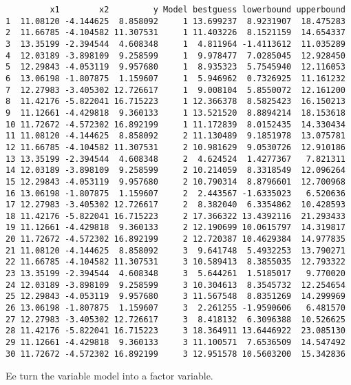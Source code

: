 \documentclass[]{article}
\newenvironment{Shaded}{\begin{snugshade}}{\end{snugshade}}
\newcommand{\DataTypeTok}[1]{\textcolor[rgb]{0.13,0.29,0.53}{#1}}
\newcommand{\DecValTok}[1]{\textcolor[rgb]{0.00,0.00,0.81}{#1}}
\newcommand{\KeywordTok}[1]{\textcolor[rgb]{0.13,0.29,0.53}{\textbf{#1}}}
\newcommand{\NormalTok}[1]{#1}
\newcommand{\OperatorTok}[1]{\textcolor[rgb]{0.81,0.36,0.00}{\textbf{#1}}}
\newcommand{\StringTok}[1]{\textcolor[rgb]{0.31,0.60,0.02}{#1}}
\begin{document}
\begin{verbatim}
         x1        x2         y Model bestguess lowerbound upperbound
1  11.08120 -4.144625  8.858092     1 13.699237  8.9231907  18.475283
2  11.66785 -4.104582 11.307531     1 11.403226  8.1521159  14.654337
3  13.35199 -2.394544  4.608348     1  4.811964 -1.4113612  11.035289
4  12.03189 -3.898109  9.258599     1  9.978477  7.0285045  12.928450
5  12.29843 -4.053119  9.957680     1  8.935323  5.7545940  12.116053
6  13.06198 -1.807875  1.159607     1  5.946962  0.7326925  11.161232
7  12.27983 -3.405302 12.726617     1  9.008104  5.8550072  12.161200
8  11.42176 -5.822041 16.715223     1 12.366378  8.5825423  16.150213
9  11.12661 -4.429818  9.360133     1 13.521520  8.8894214  18.153618
10 11.72672 -4.572302 16.892199     1 11.172839  8.0152435  14.330434
11 11.08120 -4.144625  8.858092     2 11.130489  9.1851978  13.075781
12 11.66785 -4.104582 11.307531     2 10.981629  9.0530726  12.910186
13 13.35199 -2.394544  4.608348     2  4.624524  1.4277367   7.821311
14 12.03189 -3.898109  9.258599     2 10.214059  8.3318549  12.096264
15 12.29843 -4.053119  9.957680     2 10.790314  8.8796601  12.700968
16 13.06198 -1.807875  1.159607     2  2.443567 -1.6335023   6.520636
17 12.27983 -3.405302 12.726617     2  8.382040  6.3354862  10.428593
18 11.42176 -5.822041 16.715223     2 17.366322 13.4392116  21.293433
19 11.12661 -4.429818  9.360133     2 12.190699 10.0615797  14.319817
20 11.72672 -4.572302 16.892199     2 12.720387 10.4629384  14.977835
21 11.08120 -4.144625  8.858092     3  9.641748  5.4932253  13.790271
22 11.66785 -4.104582 11.307531     3 10.589413  8.3855035  12.793322
23 13.35199 -2.394544  4.608348     3  5.644261  1.5185017   9.770020
24 12.03189 -3.898109  9.258599     3 10.304613  8.3545732  12.254654
25 12.29843 -4.053119  9.957680     3 11.567548  8.8351269  14.299969
26 13.06198 -1.807875  1.159607     3  2.261255 -1.9590606   6.481570
27 12.27983 -3.405302 12.726617     3  8.418132  6.3096388  10.526625
28 11.42176 -5.822041 16.715223     3 18.364911 13.6446922  23.085130
29 11.12661 -4.429818  9.360133     3 11.100571  7.6536509  14.547492
30 11.72672 -4.572302 16.892199     3 12.951578 10.5603200  15.342836
\end{verbatim}

Ee turn the variable model into a factor variable.

\begin{Shaded}
\end{Shaded}
\end{document}
